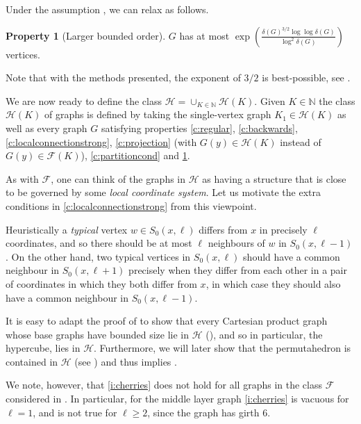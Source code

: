 \documentclass[reqno,a4paper,11pt]{amsart}
\newcounter{prop}
\theoremstyle{definition}
\newtheorem{property}{Property}
\renewcommand{\theproperty}{P\arabic{property}}
\renewcommand{\geq}{\geqslant}
\begin{document}
Under the assumption , we can relax  as follows.
\let\oldproperty\theproperty\renewcommand{\theproperty}{P6$'$}
\begin{property}[Larger bounded order]\makeatletter\edef\@currentlabel{(\theproperty)}\makeatother\label{c:bound-larger}
  $G$ has at most $\exp\left(\frac{\delta(G)^{3/2} \log \log \delta(G)}{\log^2 \delta(G)}\right)$ vertices.
\end{property}

Note that with the methods presented, the exponent of $3/2$ is best-possible, see .

We are now ready to define the class $\mathcal{H}=\cup_{K\in \mathbb{N}} \mathcal{H}(K)$.
Given $K \in \mathbb{N}$ the class $\mathcal{H}(K)$ of graphs is defined by taking the single-vertex graph $K_1 \in \mathcal{H}(K)$ as well as every graph $G$ satisfying properties \ref{c:regular}, \ref{c:backwards}, \ref{c:localconnectionstrong}, \ref{c:projection} (with $G(y) \in \mathcal{H}(K)$ instead of $G(y) \in \mathcal{F}(K)$), \ref{c:partitioncond} and \ref{c:bound-larger}.

As with $\mathcal{F}$, one can think of the graphs in $\mathcal{H}$ as having a structure that is close to be governed by some \emph{local coordinate system}.
Let us motivate the extra conditions in \ref{c:localconnectionstrong} from this viewpoint.

Heuristically a \emph{typical} vertex $w \in S_0(x,\ell)$ differs from $x$ in precisely $\ell$ coordinates, and so there should be at most $\ell$ neighbours of $w$ in $S_0(x,\ell-1)$.
On the other hand, two typical vertices in $S_0(x,\ell)$ should have a common neighbour in $S_0(x,\ell+1)$ precisely when they differ from each other in a pair of coordinates in which they both differ from $x$, in which case they should also have a common neighbour in $S_0(x,\ell-1)$.

It is easy to adapt the proof of \cite[Lemma 8.2]{CEGK24} to show that every Cartesian product graph whose base graphs have bounded size lie in $\mathcal{H}$ (), and so in particular, the hypercube, lies in $\mathcal{H}$.
Furthermore, we will later show that the permutahedron is contained in $\mathcal{H}$ (see ) and thus  implies .

We note, however, that \ref{i:cherries} does not hold for all graphs in the class $\mathcal{F}$ considered in \cite{CEGK24}.
In particular, for the middle layer graph \ref{i:cherries} is vacuous for $\ell=1$, and is not true for $\ell \geq 2$, since the graph has girth $6$.
\end{document}
